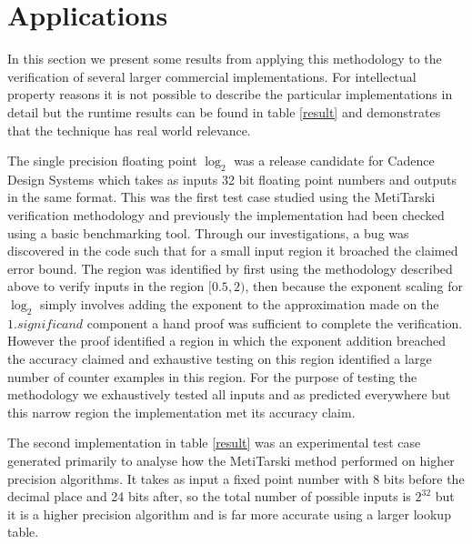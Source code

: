\documentclass[a4]{article}
\begin{document}
\section{Applications}
In this section we present some results from applying this methodology to the verification of several larger commercial implementations. For intellectual property reasons it is not possible to describe the particular implementations in detail but the runtime results can be found in table \ref{result} and demonstrates that the technique has real world relevance. 

The single precision floating point $\log_2$ was a release candidate for Cadence Design Systems which takes as inputs 32 bit floating point numbers and outputs in the same format. This was the first test case studied using the MetiTarski verification methodology and previously the implementation had been checked using a basic benchmarking tool. Through our investigations, a bug was discovered in the code such that for a small input region it broached the claimed error bound. The region was identified by first using the methodology described above to verify inputs in the region $[0.5,2)$, then because the exponent scaling for $\log_2$ simply involves adding the exponent to the approximation made on the $1.significand$ component a hand proof was sufficient to complete the verification. However the proof identified a region in which the exponent addition breached the accuracy claimed and exhaustive testing on this region identified a large number of counter examples in this region. For the purpose of testing the methodology we exhaustively tested all inputs and as predicted everywhere but this narrow region the implementation met its accuracy claim.

The second implementation in table \ref{result} was an experimental test case generated primarily to analyse how the MetiTarski method performed on higher precision algorithms. It takes as input a fixed point number with 8 bits before the decimal place and 24 bits after, so the total number of possible inputs is $2^{32}$ but it is a higher precision algorithm and is far more accurate using a larger lookup table.
\end{document}
